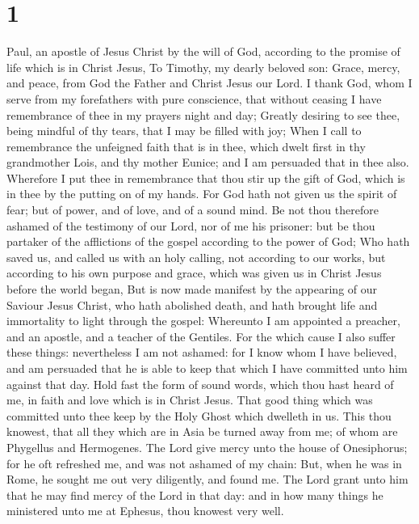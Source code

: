 \hypertarget{section}{%
\section{1}\label{section}}

 Paul, an apostle of Jesus Christ by the will of God,
according to the promise of life which is in Christ Jesus, 
To Timothy, my dearly beloved son: Grace, mercy, and peace, from God the
Father and Christ Jesus our Lord.  I thank God, whom I serve
from my forefathers with pure conscience, that without ceasing I have
remembrance of thee in my prayers night and day;  Greatly
desiring to see thee, being mindful of thy tears, that I may be filled
with joy;  When I call to remembrance the unfeigned faith
that is in thee, which dwelt first in thy grandmother Lois, and thy
mother Eunice; and I am persuaded that in thee also. 
Wherefore I put thee in remembrance that thou stir up the gift of God,
which is in thee by the putting on of my hands.  For God
hath not given us the spirit of fear; but of power, and of love, and of
a sound mind.  Be not thou therefore ashamed of the
testimony of our Lord, nor of me his prisoner: but be thou partaker of
the afflictions of the gospel according to the power of God;
 Who hath saved us, and called us with an holy calling, not
according to our works, but according to his own purpose and grace,
which was given us in Christ Jesus before the world began, 
But is now made manifest by the appearing of our Saviour Jesus Christ,
who hath abolished death, and hath brought life and immortality to light
through the gospel:  Whereunto I am appointed a preacher,
and an apostle, and a teacher of the Gentiles.  For the
which cause I also suffer these things: nevertheless I am not ashamed:
for I know whom I have believed, and am persuaded that he is able to
keep that which I have committed unto him against that day.
 Hold fast the form of sound words, which thou hast heard
of me, in faith and love which is in Christ Jesus.  That
good thing which was committed unto thee keep by the Holy Ghost which
dwelleth in us.  This thou knowest, that all they which are
in Asia be turned away from me; of whom are Phygellus and Hermogenes.
 The Lord give mercy unto the house of Onesiphorus; for he
oft refreshed me, and was not ashamed of my chain:  But,
when he was in Rome, he sought me out very diligently, and found me.
 The Lord grant unto him that he may find mercy of the Lord
in that day: and in how many things he ministered unto me at Ephesus,
thou knowest very well.

